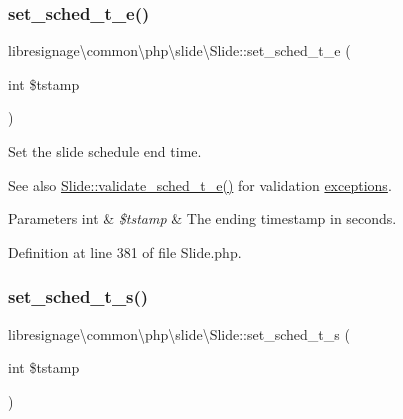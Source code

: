 \subsubsection{\texorpdfstring{set\+\_\+sched\+\_\+t\+\_\+e()}{set\_sched\_t\_e()}}
{\footnotesize\ttfamily libresignage\textbackslash{}common\textbackslash{}php\textbackslash{}slide\textbackslash{}\+Slide\+::set\+\_\+sched\+\_\+t\+\_\+e (\begin{DoxyParamCaption}\item[{int}]{\$tstamp }\end{DoxyParamCaption})}

Set the slide schedule end time.

\begin{DoxySeeAlso}{See also}
\hyperlink{classlibresignage_1_1common_1_1php_1_1slide_1_1Slide_acd01eb2b7ebb3e65969995d7893b8cff}{Slide\+::validate\+\_\+sched\+\_\+t\+\_\+e()} for validation \hyperlink{namespacelibresignage_1_1common_1_1php_1_1slide_1_1exceptions}{exceptions}.
\end{DoxySeeAlso}

\begin{DoxyParams}[1]{Parameters}
int & {\em \$tstamp} & The ending timestamp in seconds. \\
\hline
\end{DoxyParams}


Definition at line 381 of file Slide.\+php.

\mbox{\label{classlibresignage_1_1common_1_1php_1_1slide_1_1Slide_acedb1a9ed68015ee252811cc48fbc45b}} 
\subsubsection{\texorpdfstring{set\+\_\+sched\+\_\+t\+\_\+s()}{set\_sched\_t\_s()}}
{\footnotesize\ttfamily libresignage\textbackslash{}common\textbackslash{}php\textbackslash{}slide\textbackslash{}\+Slide\+::set\+\_\+sched\+\_\+t\+\_\+s (\begin{DoxyParamCaption}\item[{int}]{\$tstamp }\end{DoxyParamCaption})}

